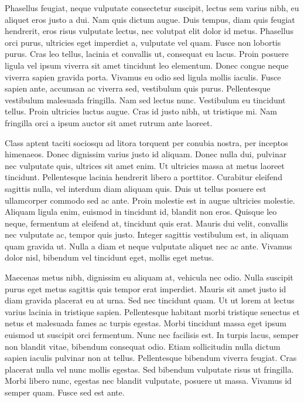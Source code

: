 \documentclass{EPUProjetDi}
\begin{document}
Phasellus feugiat, neque vulputate consectetur suscipit, lectus sem varius nibh, eu aliquet eros justo a dui. Nam quis dictum augue. Duis tempus, diam quis feugiat hendrerit, eros risus vulputate lectus, nec volutpat elit dolor id metus. Phasellus orci purus, ultricies eget imperdiet a, vulputate vel quam. Fusce non lobortis purus. Cras leo tellus, lacinia et convallis ut, consequat eu lacus. Proin posuere ligula vel ipsum viverra sit amet tincidunt leo elementum. Donec congue neque viverra sapien gravida porta. Vivamus eu odio sed ligula mollis iaculis. Fusce sapien ante, accumsan ac viverra sed, vestibulum quis purus. Pellentesque vestibulum malesuada fringilla. Nam sed lectus nunc. Vestibulum eu tincidunt tellus. Proin ultricies luctus augue. Cras id justo nibh, ut tristique mi. Nam fringilla orci a ipsum auctor sit amet rutrum ante laoreet.

Class aptent taciti sociosqu ad litora torquent per conubia nostra, per inceptos himenaeos. Donec dignissim varius justo id aliquam. Donec nulla dui, pulvinar nec vulputate quis, ultrices sit amet enim. Ut ultricies massa at metus laoreet tincidunt. Pellentesque lacinia hendrerit libero a porttitor. Curabitur eleifend sagittis nulla, vel interdum diam aliquam quis. Duis ut tellus posuere est ullamcorper commodo sed ac ante. Proin molestie est in augue ultricies molestie. Aliquam ligula enim, euismod in tincidunt id, blandit non eros. Quisque leo neque, fermentum at eleifend at, tincidunt quis erat. Mauris dui velit, convallis nec vulputate ac, tempor quis justo. Integer sagittis vestibulum est, in aliquam quam gravida ut. Nulla a diam et neque vulputate aliquet nec ac ante. Vivamus dolor nisl, bibendum vel tincidunt eget, mollis eget metus.

Maecenas metus nibh, dignissim eu aliquam at, vehicula nec odio. Nulla suscipit purus eget metus sagittis quis tempor erat imperdiet. Mauris sit amet justo id diam gravida placerat eu at urna. Sed nec tincidunt quam. Ut ut lorem at lectus varius lacinia in tristique sapien. Pellentesque habitant morbi tristique senectus et netus et malesuada fames ac turpis egestas. Morbi tincidunt massa eget ipsum euismod ut suscipit orci fermentum. Nunc nec facilisis est. In turpis lacus, semper non blandit vitae, bibendum consequat odio. Etiam sollicitudin nulla dictum sapien iaculis pulvinar non at tellus. Pellentesque bibendum viverra feugiat. Cras placerat nulla vel nunc mollis egestas. Sed bibendum vulputate risus ut fringilla. Morbi libero nunc, egestas nec blandit vulputate, posuere ut massa. Vivamus id semper quam. Fusce sed est ante.
\end{document}
